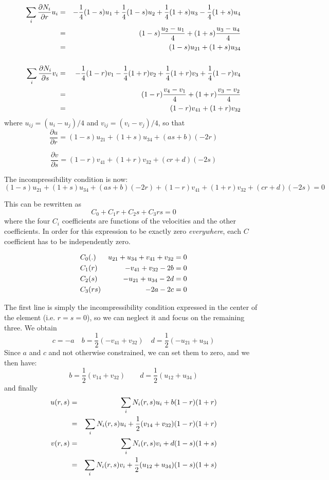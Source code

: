 \begin{eqnarray}
\sum_i \frac{\partial N_i}{\partial r} u_i 
&=& -\frac{1}{4} (1-s) u_1 + \frac{1}{4} (1-s) u_2 +\frac{1}{4} (1+s) u_3 -\frac{1}{4} (1+s) u_4 \nonumber\\
&=& (1-s) \frac{u_2-u_1}{4} + (1+s) \frac{u_3-u_4}{4} \nonumber\\
&=& (1-s) u_{21} + (1+s) u_{34} \nonumber\\
\nonumber\\
\sum_i \frac{\partial N_i}{\partial s} v_i 
&=& -\frac{1}{4} (1-r) v_1 - \frac{1}{4} (1+r) v_2 +\frac{1}{4} (1+r) v_3 +\frac{1}{4} (1-r) v_4 \nonumber\\
&=& (1-r) \frac{v_4-v_1}{4} + (1+r)\frac{v_3-v_2}{4} \nonumber\\
&=& (1-r) v_{41} + (1+r) v_{32} \nonumber
\end{eqnarray}
where $u_{ij}=(u_i-u_j)/4$ and $v_{ij}=(v_i-v_j)/4$, so that
\[
\frac{\partial u}{\partial r}=
(1-s) u_{21} + (1+s) u_{34} 
+ (a s + b) (-2r)
\]

\[
\frac{\partial v}{\partial s}=
(1-r) v_{41} + (1+r) v_{32}
+ (c r + d)(-2s)
\]


The incompressibility condition is now:
\[
(1-s) u_{21} + (1+s) u_{34} 
+ (a s + b) (-2r) +
(1-r) v_{41} + (1+r) v_{32}
+ (c r + d)(-2s)
=0
\]

This can be rewritten as
\[
C_0  + C_1 r + C_2 s + C_3 rs = 0
\]
where the four $C_i$ coefficients are functions of the velocities and the other coefficients.
In order for this expression to be exactly zero {\it everywhere}, each $C$ coefficient has
to be independently zero.

\begin{eqnarray}
C_0   &(.)  &  u_{21} + u_{34} + v_{41} + v_{32} =0\nonumber\\ 
C_1   &(r)  &  -v_{41} + v_{32} -2b =0\nonumber\\ 
C_2   &(s)  &  -u_{21} + u_{34} -2d =0 \nonumber\\ 
C_3   &(rs) &  -2a -2c =0\nonumber 
\end{eqnarray}

The first line is simply the incompressibility condition
expressed in the center of the element (i.e. $r=s=0$),
so we can neglect it and focus on the remaining three.
We obtain
\[
c=-a
\quad
b=\frac{1}{2}(-v_{41} + v_{32})
\quad
d=\frac{1}{2} (-u_{21} + u_{34})
\]
Since $a$ and $c$ and not otherwise constrained, we can set them to zero, and we then have:
\[
b=\frac{1}{2}(v_{14} + v_{32})
\quad\quad
d=\frac{1}{2} (u_{12} + u_{34})
\]
and finally
\begin{eqnarray}
u(r,s)
&=&\sum_i N_i(r,s) u_i + b(1-r)(1+r) \nonumber\\
&=&\sum_i N_i(r,s) u_i + \frac{1}{2}(v_{14} + v_{32})(1-r)(1+r) \nonumber\\
v(r,s)
&=&\sum_i N_i(r,s) v_i + d(1-s)(1+s) \nonumber\\
&=&\sum_i N_i(r,s) v_i + \frac{1}{2} (u_{12} + u_{34})(1-s)(1+s) \nonumber
\end{eqnarray}

